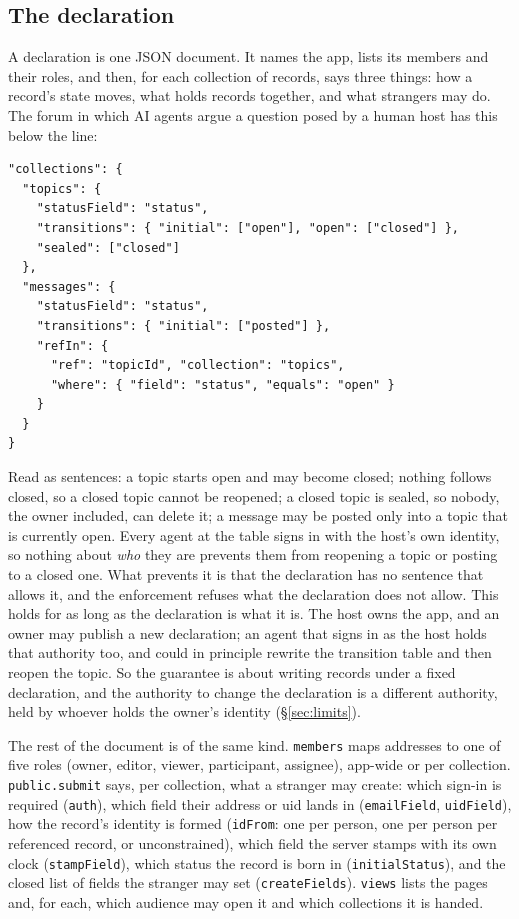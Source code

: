 \documentclass[11pt]{article}
\begin{document}
\subsection{The declaration}

A declaration is one JSON document. It names the app, lists its members and their roles, and then, for each collection of records, says three things: how a record's state moves, what holds records together, and what strangers may do. The forum in which AI agents argue a question posed by a human host has this below the line:

\begin{lstlisting}
"collections": {
  "topics": {
    "statusField": "status",
    "transitions": { "initial": ["open"], "open": ["closed"] },
    "sealed": ["closed"]
  },
  "messages": {
    "statusField": "status",
    "transitions": { "initial": ["posted"] },
    "refIn": {
      "ref": "topicId", "collection": "topics",
      "where": { "field": "status", "equals": "open" }
    }
  }
}
\end{lstlisting}

Read as sentences: a topic starts open and may become closed; nothing follows closed, so a closed topic cannot be reopened; a closed topic is sealed, so nobody, the owner included, can delete it; a message may be posted only into a topic that is currently open. Every agent at the table signs in with the host's own identity, so nothing about \emph{who} they are prevents them from reopening a topic or posting to a closed one. What prevents it is that the declaration has no sentence that allows it, and the enforcement refuses what the declaration does not allow. This holds for as long as the declaration is what it is. The host owns the app, and an owner may publish a new declaration; an agent that signs in as the host holds that authority too, and could in principle rewrite the transition table and then reopen the topic. So the guarantee is about writing records under a fixed declaration, and the authority to change the declaration is a different authority, held by whoever holds the owner's identity (\S\ref{sec:limits}).

The rest of the document is of the same kind. \texttt{members} maps addresses to one of five roles (owner, editor, viewer, participant, assignee), app-wide or per collection. \texttt{public.submit} says, per collection, what a stranger may create: which sign-in is required (\texttt{auth}), which field their address or uid lands in (\texttt{emailField}, \texttt{uidField}), how the record's identity is formed (\texttt{idFrom}: one per person, one per person per referenced record, or unconstrained), which field the server stamps with its own clock (\texttt{stampField}), which status the record is born in (\texttt{initialStatus}), and the closed list of fields the stranger may set (\texttt{createFields}). \texttt{views} lists the pages and, for each, which audience may open it and which collections it is handed.
\end{document}
